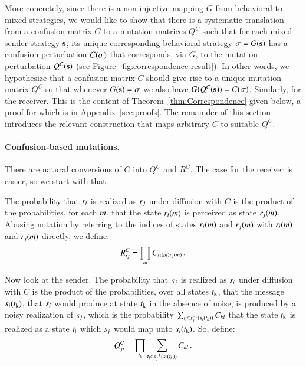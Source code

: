 More concretely, since there is a non-injective mapping $G$ from
behavioral to mixed strategies, we would like to show that there is a
systematic translation from a confusion matrix $C$ to a mutation
matrices $Q^C$ such that for each mixed sender strategy $\mathrm{\mathbf{s}}$, its
unique corresponding behavioral strategy $\sigma = G(\mathrm{\mathbf{s}})$ has a
confusion-perturbation $C(\sigma)$ that corresponds, via $G$, to the
mutation-perturbation $Q^C(\mathrm{\mathbf{s}})$ (see
Figure~\ref{fig:correspondence-result}). In other words, we
hypothesize that a confusion matrix $C$ should give rise to a unique
mutation matrix $Q^C$ so that whenever $G(\mathrm{\mathbf{s}}) = \sigma$ we also
have $G(Q^C(\mathrm{\mathbf{s}})) = C(\sigma)$. Similarly, for the receiver. This
is the content of Theorem~\ref{thm:Correspondence} given below, a
proof for which is in Appendix~\ref{sec:proofs}. The remainder of this
section introduces the relevant construction that maps arbitrary $C$
to suitable $Q^C$.

\paragraph{Confusion-based mutations.} There are natural conversions
of $C$ into $Q^C$ and $R^C$. The case for the receiver is easier, so
we start with that.

The probability that $r_i$ is realized as $r_j$ under
diffusion with $C$ is the product of the probabilities, for each
$m$, that the state $r_i(m)$ is perceived as state
$r_j(m)$. Abusing notation by referring to the indices of
states $r_i(m)$ and $r_j(m)$ with
$r_i(m)$ and $r_j(m)$ directly, we define:
\begin{align}
  \label{eq:construction-rec}
  R^C_{ij} = \prod_{m} C_{r_i(m)r_j(m)}\,.
\end{align}

Now look at the sender. The probability that $s_j$ is realized as
$s_i$ under diffusion with $C$ is the product of the
probabilities, over all states $t_{\mathrm{k}}$, that the message
$s_i(t_{\mathrm{k}})$, that $s_i$ would produce at state
$t_{\mathrm{k}}$ in the absence of noise, is produced by a noisy
realization of $s_j$, which is the probability $\sum_{t_l
  \in s_j^{-1}(s_i(t_k))} C_{kl}$ that the state
$t_{\mathrm{k}}$ is realized as a state $t_{\mathrm{l}}$ which $s_j$
would map unto $s_i(t_{\mathrm{k}})$. So, define:
\begin{align}
  \label{eq:construction-sen}
  Q^C_{ji} = \prod_{t_k} \sum_{t_l \in
    s_j^{-1}(s_i(t_k))} C_{kl}\,.
\end{align}

